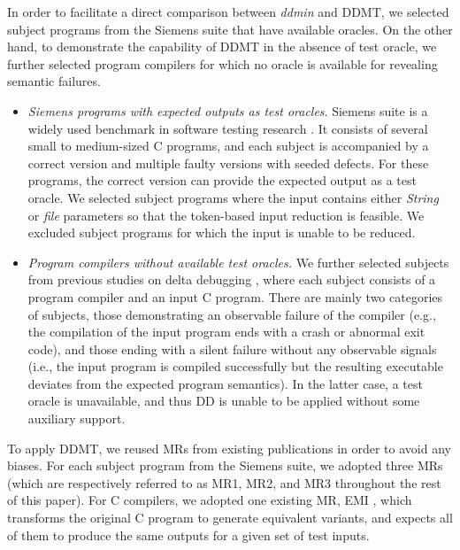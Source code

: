 In order to facilitate a direct comparison between \emph{ddmin} and DDMT, we selected subject programs from the Siemens suite that have available oracles. 
On the other hand, to demonstrate the capability of DDMT in the absence of test oracle,
we further selected program compilers for which no oracle is available for revealing semantic failures.



\begin{itemize}
\item \emph{Siemens programs with expected outputs as test oracles}.
Siemens suite is a widely used benchmark in software testing research \cite{Xie2013, Chen2011, Jiang2021}. 
It consists of several small to medium-sized C programs, and each subject is accompanied by a correct version and multiple faulty versions with seeded defects. 
For these programs, the correct version can provide the expected output as a test oracle.
We selected subject programs where the input contains either \emph{String} or \emph{file} parameters so that the token-based input reduction is feasible.
We excluded subject programs for which the input is unable to be reduced.


\item \emph{Program compilers without available test oracles.}
We further selected subjects from previous studies on delta debugging \cite{Sun2018, wang2021, zhou2025wdd, zhang2025toward}, where each subject consists of a program compiler and an input C program.
There are mainly two categories of subjects, those demonstrating an observable failure of the compiler (e.g., the compilation of the input program ends with a crash or abnormal exit code), and those ending with a silent failure without any observable signals (i.e., the input program is compiled successfully but the resulting executable deviates from the expected program semantics).
In the latter case, a test oracle is unavailable, and thus DD is unable to be applied without some auxiliary support.
\end{itemize}

To apply DDMT, we reused MRs from existing publications in order to avoid any biases.
For each subject program from the Siemens suite, we adopted three MRs (which are respectively referred to as MR1, MR2, and MR3 throughout the rest of this paper).
For C compilers, we adopted one existing MR, EMI \cite{Le2014}, which transforms the original C program to generate equivalent variants, and expects all of them to produce the same outputs for a given set of test inputs.  

